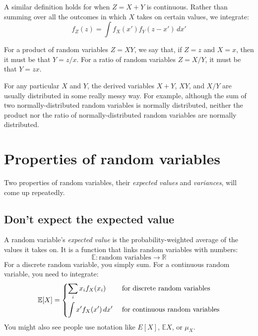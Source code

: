 A similar definition holds for when $Z = X + Y$ is continuous. Rather than
summing over all the outcomes in which $X$ takes on certain values, we integrate:
\begin{equation}
f_Z(z) = \int f_X(x') f_Y(z - x') \,dx'
\end{equation}

For a product of random variables $Z = XY$, we say that,
if $Z = z$ and $X = x$, then it must be that $Y = z/x$.
For a ratio of random variables $Z = X/Y$, it must be that $Y = zx$.

For any particular $X$ and $Y$, the derived variables $X + Y$, $XY$, and $X/Y$
are usually distributed in some really messy way. For example, although the
sum of two normally-distributed random variables is normally distributed,
neither the product nor the ratio of normally-distributed random variables are
normally distributed.

\section{Properties of random variables}

Two properties of random variables, their \emph{expected values} and
\emph{variances}, will come up repeatedly.

\subsection{Don't expect the expected value}

A random variable's \emph{expected value} is the probability-weighted average
of the values it takes on. It is a function that links random variables with
numbers:
\begin{equation*}
\mathbb{E} : \text{random variables} \to \mathbb{R}
\end{equation*}
For a discrete random variable, you simply sum. For a continuous random
variable, you need to integrate:
\begin{equation}
\mathbb{E}\!\left[{X}\right] = \begin{dcases}
  \sum_i x_i f_X(x_i) & \text{ for discrete random variables} \\
  \int x' f_X(x') \,dx' & \text{ for continuous random variables}
\end{dcases}
\end{equation}
You might also see people use notation like $E[X]$, $\mathbb{E}X$, or $\mu_X$.


